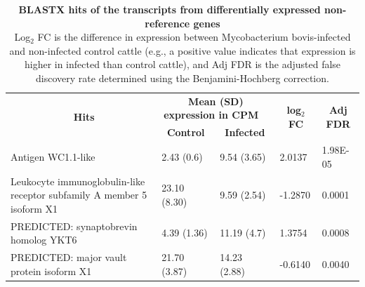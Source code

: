 \documentclass[../main.tex]{subfiles}
\begin{document}
\begin{flushleft}
\begin{landscape}
    \begin{table}
        \centering
        \caption[BLAST hits of differentially expressed novel genes]{\textbf{BLASTX hits of the transcripts from differentially expressed non-reference genes} \\
        \small{Log$_2$ FC is the difference in expression between Mycobacterium bovis-infected and non-infected control cattle (e.g., a positive value indicates that expression is higher in infected than control cattle), and Adj FDR is the adjusted false discovery rate determined using the Benjamini-Hochberg correction. }}
        \bigskip
        \bigskip
        \small
        \centering
        \label{sup_tab:s43}
        \begin{tabular}{|l|l|l|l|l|}
        \hline
        \multicolumn{1}{|c|}{\multirow{2}{*}{\textbf{~Hits}}}                  & \multicolumn{2}{c|}{\textbf{Mean (SD) expression in CPM ~}}                    & \multicolumn{1}{c|}{\multirow{2}{*}{\textbf{log$_2$ FC}}} & \multicolumn{1}{c|}{\multirow{2}{*}{\textbf{Adj FDR}}}  \\
        \cline{2-3}
        \multicolumn{1}{|c|}{}                                                 & \multicolumn{1}{c|}{\textbf{Control}} & \multicolumn{1}{c|}{\textbf{Infected}} & \multicolumn{1}{c|}{}                                  & \multicolumn{1}{c|}{}                                   \\
        \hline
        Antigen WC1.1-like                                                     & 2.43 (0.6)                            & 9.54 (3.65)                            & 2.0137                                                 & 1.98E-05                                                \\
        \hline
        Leukocyte immunoglobulin-like receptor subfamily A member 5 isoform X1 & 23.10 (8.30)                          & 9.59 (2.54)                            & -1.2870                                                & 0.0001                                                  \\
        \hline
        PREDICTED: synaptobrevin homolog YKT6                                  & 4.39 (1.36)                           & 11.19 (4.7)                            & 1.3754                                                 & 0.0008                                                  \\
        \hline
        PREDICTED: major vault protein isoform X1                              & 21.70 (3.87)                          & 14.23 (2.88)                           & -0.6140                                                & 0.0040                                                  \\

\end{tabular}
\end{table}
\end{landscape}
\end{flushleft}
\end{document}
